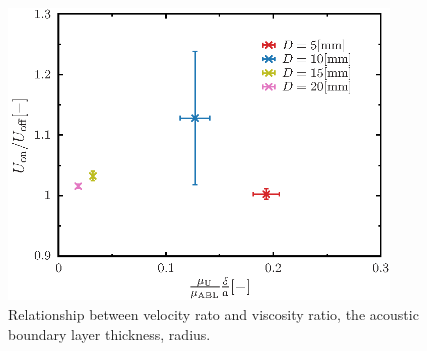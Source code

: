 \begin{figure}[ht]
    \centering
    \includegraphics[width=0.9\textwidth]{./5-Results/diameter-0.5/mu_Udiff.eps}
    \caption{Relationship between velocity rato and viscosity ratio, the acoustic boundary layer thickness, radius.}
    \label{fig:muUdiff0.5}
\end{figure}